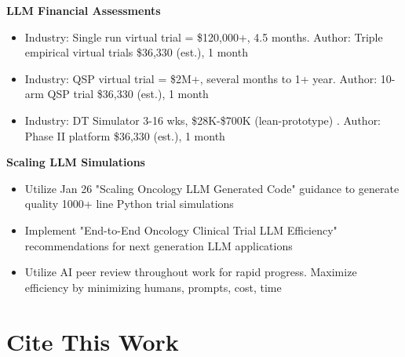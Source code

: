 \documentclass{article}
\begin{document}
\raggedright \textbf{LLM Financial Assessments} \cite{16KawchakPaper, 17KawchakPaper, 18KawchakPaper}
\vspace{-0.1em}
    \begin{itemize} [leftmargin=3.45em, itemsep=0em, topsep=0em] \fontsize{9.5pt}{10.5pt}\selectfont
    \item[\raisebox{0.25ex}{\scalebox{0.7}{$\bullet$}}] Industry: Single run virtual trial = \$120,000+, 4.5 months. Author: Triple empirical virtual trials \$36,330 (est.), 1 month  
    \item[\raisebox{0.25ex}{\scalebox{0.7}{$\bullet$}}] Industry: QSP virtual trial = \$2M+, several months to 1+ year. Author: 10-arm QSP trial \$36,330 (est.), 1 month  
    \item[\raisebox{0.25ex}{\scalebox{0.7}{$\bullet$}}] Industry: DT Simulator 3-16 wks, \$28K-\$700K (lean-prototype) \cite{GPT52}. Author: Phase II platform \$36,330 (est.), 1 month 
    \end{itemize}
\vspace{0.1cm}




\raggedright \textbf{Scaling LLM Simulations} \cite{ScalingOncology, 19KawchakPaper, 21KawchakPaper}
\vspace{-0.1em}
    \begin{itemize} [leftmargin=3.45em, itemsep=0em, topsep=0.0em] \fontsize{9.5pt}{10.5pt}\selectfont
    \item[\raisebox{0.25ex}{\scalebox{0.7}{$\bullet$}}] Utilize Jan 26 "Scaling Oncology LLM Generated Code" guidance to generate quality 1000+ line Python trial simulations   
    \item[\raisebox{0.25ex}{\scalebox{0.7}{$\bullet$}}] Implement "End-to-End Oncology Clinical Trial LLM Efficiency" recommendations for next generation LLM applications
    \item[\raisebox{0.25ex}{\scalebox{0.7}{$\bullet$}}] Utilize AI peer review throughout work for rapid progress. Maximize efficiency by minimizing humans, prompts, cost, time
    \end{itemize}
\vspace{0.1cm}





\section*{\large Cite This Work}
 \normalsize
\end{document}
